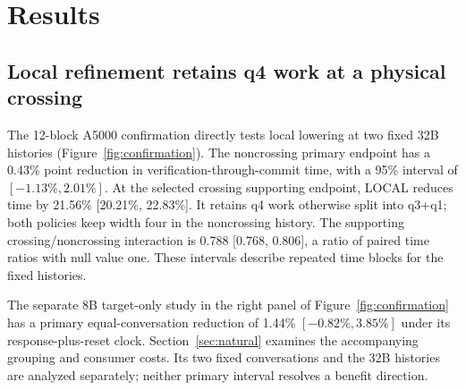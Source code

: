 \section{Results}
\label{sec:results}

\subsection{Local refinement retains q4 work at a physical crossing}
\label{sec:local}
The 12-block A5000 confirmation directly tests local lowering at two fixed 32B histories (Figure~\ref{fig:confirmation}). The noncrossing primary endpoint has a 0.43\% point reduction in verification-through-commit time, with a 95\% interval of $[-1.13\%,2.01\%]$. At the selected crossing supporting endpoint, LOCAL reduces time by 21.56\% [20.21\%, 22.83\%]. It retains q4 work otherwise split into q3+q1; both policies keep width four in the noncrossing history. The supporting crossing/noncrossing interaction is 0.788 [0.768, 0.806], a ratio of paired time ratios with null value one. These intervals describe repeated time blocks for the fixed histories.

The separate 8B target-only study in the right panel of Figure~\ref{fig:confirmation} has a primary equal-conversation reduction of 1.44\% $[-0.82\%,3.85\%]$ under its response-plus-reset clock. Section~\ref{sec:natural} examines the accompanying grouping and consumer costs. Its two fixed conversations and the 32B histories are analyzed separately; neither primary interval resolves a benefit direction.


